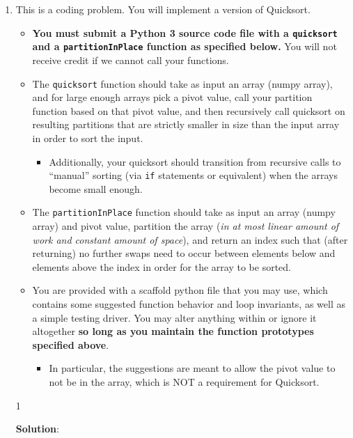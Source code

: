 \documentclass[9pt]{article}
\def\solutions{1}
\begin{document}
\begin{enumerate}
\item This is a coding problem.  You will implement a version of Quicksort.
  \begin{itemize}
  \item \textbf{You must submit a Python 3 source code file with a \texttt{quicksort} and a \texttt{partitionInPlace} function as specified below.}  You will not receive credit if we cannot call your functions.
  \item The \texttt{quicksort} function should take as input an array (numpy array), and for large enough arrays pick a pivot value, call your partition function based on that pivot value, and then recursively call quicksort on resulting partitions that are strictly smaller in size than the input array in order to sort the input.
    \begin{itemize}
    \item Additionally, your quicksort should transition from recursive calls to ``manual'' sorting (via \texttt{if} statements or equivalent) when the arrays become small enough.
    \end{itemize}
  \item The \texttt{partitionInPlace} function should take as input an array (numpy array) and pivot value, partition the array (\emph{in at most linear amount of work and constant amount of space}), and return an index such that (after returning) no further swaps need to occur between elements below and elements above the index in order for the array to be sorted.
  \item You are provided with a scaffold python file that you may use, which contains some suggested function behavior and loop invariants, as well as a simple testing driver.  You may alter anything within or ignore it altogether \textbf{so long as you maintain the function prototypes specified above}.
    \begin{itemize}
    \item In particular, the suggestions are meant to allow the pivot value to not be in the array, which is NOT a requirement for Quicksort.
    \end{itemize}
  \end{itemize}

\if\solutions1
\vspace{3mm}

{\bf Solution}: \\


\fi



\end{enumerate}
\end{document}
